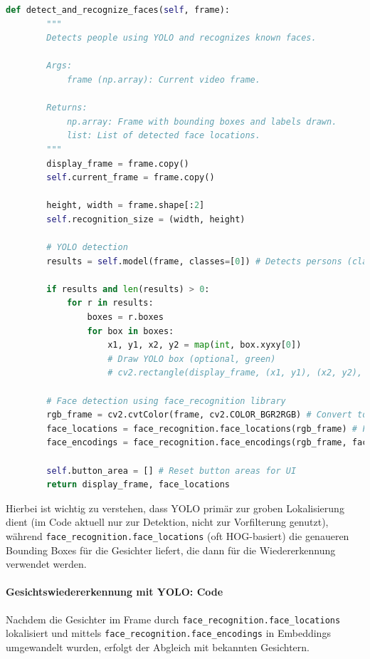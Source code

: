 \begin{lstlisting}[language=Python, caption={Gesichtsdetektion mit YOLO und face\_recognition}, label={lst:yolo_detect}, inputencoding=utf8]
    def detect_and_recognize_faces(self, frame):
        """
        Detects people using YOLO and recognizes known faces.

        Args:
            frame (np.array): Current video frame.

        Returns:
            np.array: Frame with bounding boxes and labels drawn.
            list: List of detected face locations.
        """
        display_frame = frame.copy()
        self.current_frame = frame.copy()

        height, width = frame.shape[:2]
        self.recognition_size = (width, height)

        # YOLO detection
        results = self.model(frame, classes=[0]) # Detects persons (class 0)

        if results and len(results) > 0:
            for r in results:
                boxes = r.boxes
                for box in boxes:
                    x1, y1, x2, y2 = map(int, box.xyxy[0])
                    # Draw YOLO box (optional, green)
                    # cv2.rectangle(display_frame, (x1, y1), (x2, y2), (0, 255, 0), 2)

        # Face detection using face_recognition library
        rgb_frame = cv2.cvtColor(frame, cv2.COLOR_BGR2RGB) # Convert to RGB
        face_locations = face_recognition.face_locations(rgb_frame) # Find faces
        face_encodings = face_recognition.face_encodings(rgb_frame, face_locations) # Encode faces

        self.button_area = [] # Reset button areas for UI
        return display_frame, face_locations
\end{lstlisting}

Hierbei ist wichtig zu verstehen, dass YOLO primär zur groben Lokalisierung dient (im Code aktuell nur zur Detektion, nicht zur Vorfilterung genutzt), während \texttt{face\_recognition.face\_locations} (oft HOG-basiert) die genaueren Bounding Boxes für die Gesichter liefert, die dann für die Wiedererkennung verwendet werden.

\paragraph{Gesichtswiedererkennung mit YOLO: Code}

Nachdem die Gesichter im Frame durch \texttt{face\_recognition.face\_locations} lokalisiert und mittels \texttt{face\_recognition.face\_encodings} in Embeddings umgewandelt wurden, erfolgt der Abgleich mit bekannten Gesichtern.

